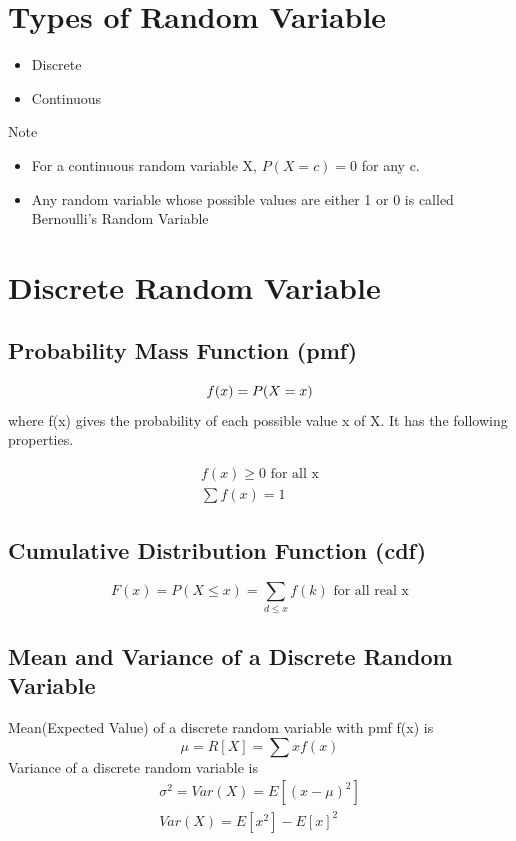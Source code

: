 \documentclass{article}
\begin{document}
    \section*{Types of Random Variable}
    \begin{itemize}
        \item Discrete
        \item Continuous
    \end{itemize}

    Note
    \begin{itemize}
        \item For a continuous random variable X, $P(X = c) = 0$ for any c.
        \item Any random variable whose possible values are either 1 or 0 is called Bernoulli's Random Variable
    \end{itemize}

    \section*{Discrete Random Variable}
    \subsection*{Probability Mass Function (pmf)}
        \begin{equation*}
            f(x)= P(X=x)\\
        \end{equation*}
        where f(x) gives the probability of each possible value x of X. It has the following properties.

        \begin{align*}
            f(x) \geq 0 \text{ for all x}\\
            \sum f(x) =1
        \end{align*}

    \subsection*{Cumulative Distribution Function (cdf)}
        \begin{equation*}
            F(x) = P(X \leq x) = \sum_{d\leq x} f(k) \text{ for all real x}
        \end{equation*}
    \subsection*{Mean and Variance of a Discrete Random Variable}
        Mean(Expected Value) of a discrete random variable with pmf f(x) is 
        \begin{equation*}
            \mu = R[X] = \sum x f(x)
        \end{equation*}
        Variance of a discrete random variable is 
        \begin{align*}
            \sigma^{2} = Var(X) = E[(x-\mu)^{2}]\\
            Var(X) = E[x^{2}] - E[x] ^{2}
        \end{align*}
\end{document}
